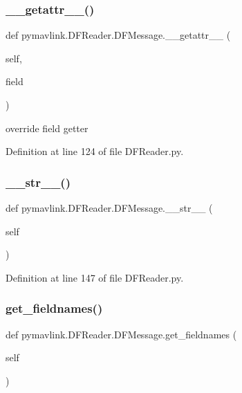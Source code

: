 \subsubsection{\texorpdfstring{\_\_getattr\_\_()}{\_\_getattr\_\_()}}
{\footnotesize\ttfamily def pymavlink.\+D\+F\+Reader.\+D\+F\+Message.\+\_\+\+\_\+getattr\+\_\+\+\_\+ (\begin{DoxyParamCaption}\item[{}]{self,  }\item[{}]{field }\end{DoxyParamCaption})}

\begin{DoxyVerb}override field getter\end{DoxyVerb}
 

Definition at line 124 of file D\+F\+Reader.\+py.

\mbox{\label{classpymavlink_1_1DFReader_1_1DFMessage_a51f01505f918b49aaa444c8a83410fc7}} 
\subsubsection{\texorpdfstring{\_\_str\_\_()}{\_\_str\_\_()}}
{\footnotesize\ttfamily def pymavlink.\+D\+F\+Reader.\+D\+F\+Message.\+\_\+\+\_\+str\+\_\+\+\_\+ (\begin{DoxyParamCaption}\item[{}]{self }\end{DoxyParamCaption})}



Definition at line 147 of file D\+F\+Reader.\+py.

\mbox{\label{classpymavlink_1_1DFReader_1_1DFMessage_a6419df98bd311797fb1a24ee517b8483}} 
\subsubsection{\texorpdfstring{get\_fieldnames()}{get\_fieldnames()}}
{\footnotesize\ttfamily def pymavlink.\+D\+F\+Reader.\+D\+F\+Message.\+get\+\_\+fieldnames (\begin{DoxyParamCaption}\item[{}]{self }\end{DoxyParamCaption})}



